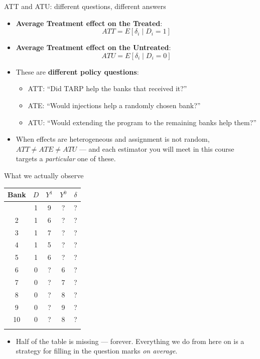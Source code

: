 \documentclass[
  11pt,
  ignorenonframetext,
  aspectratio=169,
]{beamer}
\newcounter{none} %
\providecommand{\tightlist}{%
  \setlength{\itemsep}{0pt}\setlength{\parskip}{0pt}}
\begin{document}
\begin{frame}{ATT and ATU: different questions, different answers}
\protect{}\label{att-and-atu-different-questions-different-answers}
\begin{itemize}
\tightlist
\item
  \textbf{Average Treatment effect on the Treated}: \[
  ATT = E[\delta_i \mid D_i = 1]
  \]
\item
  \textbf{Average Treatment effect on the Untreated}: \[
  ATU = E[\delta_i \mid D_i = 0]
  \]
\item
  These are \textbf{different policy questions}:

  \begin{itemize}
  \tightlist
  \item
    ATT: ``Did TARP help the banks that received it?''
  \item
    ATE: ``Would injections help a randomly chosen bank?''
  \item
    ATU: ``Would extending the program to the remaining banks help
    them?''
  \end{itemize}
\item
  When effects are heterogeneous and assignment is not random,
  \(ATT \neq ATE \neq ATU\) --- and each estimator you will meet in this
  course targets a \emph{particular} one of these.
\end{itemize}
\end{frame}

\begin{frame}{What we actually observe}
\protect{}\label{what-we-actually-observe}
{\def\LTcaptype{none} %
\begin{longtable}[]{@{}ccccc@{}}
\toprule\noalign{}
Bank & \(D\) & \(Y^1\) & \(Y^0\) & \(\delta\) \\
\midrule\noalign{}
\endhead
1 & 1 & 9 & ? & ? \\
2 & 1 & 6 & ? & ? \\
3 & 1 & 7 & ? & ? \\
4 & 1 & 5 & ? & ? \\
5 & 1 & 6 & ? & ? \\
6 & 0 & ? & 6 & ? \\
7 & 0 & ? & 7 & ? \\
8 & 0 & ? & 8 & ? \\
9 & 0 & ? & 9 & ? \\
10 & 0 & ? & 8 & ? \\
\bottomrule\noalign{}
\end{longtable}
}

\begin{itemize}
\tightlist
\item
  Half of the table is missing --- forever. Everything we do from here
  on is a strategy for filling in the question marks \emph{on average}.
\end{itemize}
\end{frame}
\end{document}
